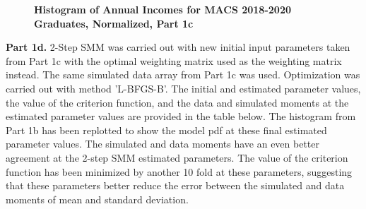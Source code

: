 \documentclass[letterpaper,12pt]{article}
\theoremstyle{definition}
\begin{document}
\begin{figure}[htb]\centering\captionsetup{width=4.0in}
  \caption{\textbf{Histogram of Annual Incomes for MACS 2018-2020 Graduates, Normalized, Part 1c}}\label{FigPS4_1c}
\end{figure}

\noindent\newline\textbf{Part 1d.} 2-Step SMM was carried out with new initial input parameters taken from Part 1c with the optimal weighting matrix used as the weighting matrix instead. The same simulated data array from Part 1c was used. Optimization was carried out with method 'L-BFGS-B'. The initial and estimated parameter values, the value of the criterion function, and the data and simulated moments at the estimated parameter values are provided in the table below. The histogram from Part 1b has been replotted to show the model pdf at these final estimated parameter values. The simulated and data moments have an even better agreement at the 2-step SMM estimated parameters. The value of the criterion function has been minimized by another 10 fold at these parameters, suggesting that these parameters better reduce the error between the simulated and data moments of mean and standard deviation.
\end{document}
